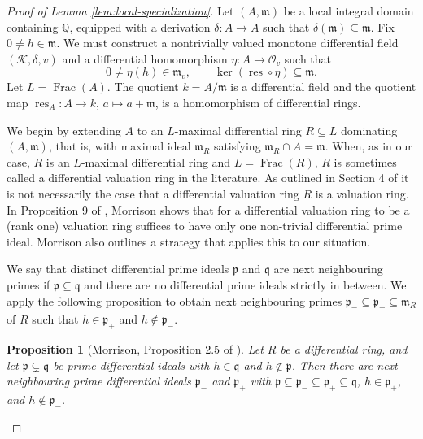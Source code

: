 \documentclass[12pt]{amsart}
\newtheorem{proposition}[theorem]{Proposition}
\theoremstyle{definition}
\numberwithin{subcase}{cases}
\theoremstyle{remark}
\DeclareMathOperator{\res}{res}
\DeclareMathOperator{\Frac}{Frac}
\begin{document}
\begin{proof}[Proof of Lemma \ref{lem:local-specialization}]
Let $(A,\mathfrak m)$ be a local integral domain containing $\mathbb{Q}$,
equipped with a derivation $\delta:A\to A$ such that
$\delta(\mathfrak m)\subseteq\mathfrak m$. Fix $0\ne h\in\mathfrak m$. We must construct a nontrivially valued monotone
differential field $(\mathcal K,\delta,v)$ and a differential
homomorphism $\eta:A\to\mathcal O_v$ such that
\begin{equation}
 0\ne\eta(h)\in\mathfrak m_v,\qquad
 \ker(\res\circ\eta)\subseteq\mathfrak m.
\end{equation}
Let $L=\Frac(A)$. The quotient $k=A/\mathfrak m$ is a
differential field and the quotient map
$\res_A:A\to k$, $a\mapsto a+\mathfrak m$, is a homomorphism of differential rings.

We begin by extending $A$ to an $L$-maximal differential ring  $R \subseteq L$ dominating $(A,\mathfrak{m})$, that is, with maximal ideal $\mathfrak{m}_R$ satisfying $\mathfrak{m}_R \cap A = \mathfrak{m}$.  When, as in our case, $R$ is an $L$-maximal differential ring and $L = \Frac(R)$, $R$ is sometimes called a differential valuation ring in the literature. As outlined in Section 4 of \cite{Morrison78} it is not necessarily the case that a differential valuation ring $R$ is a valuation ring. In Proposition 9 of \cite{Morrison78}, Morrison shows that for a differential valuation ring to be a (rank one) valuation ring suffices to have only one non-trivial differential prime ideal. Morrison \cite{Morrison79} also outlines a strategy that applies this to our situation.

We say that distinct differential prime ideals $\mathfrak{p}$ and $\mathfrak{q}$ are next neighbouring primes if $\mathfrak{p} \subseteq \mathfrak{q}$ and there are no differential prime ideals strictly in between. We apply the following proposition to obtain next neighbouring primes $\mathfrak{p}_- \subseteq \mathfrak{p}_+ \subseteq \mathfrak{m}_R$ of $R$ such that $h \in \mathfrak{p}_+$ and $h \notin \mathfrak{p}_-$.

\begin{proposition}[Morrison, Proposition 2.5 of \cite{Morrison79}]
    Let $R$ be a differential ring, and let $\mathfrak{p} \subsetneq \mathfrak{q}$ be prime differential ideals with $h \in \mathfrak{q}$ and $h \notin \mathfrak{p}$. Then there are next neighbouring prime differential ideals $\mathfrak{p}_-$ and $\mathfrak{p}_+$  with $\mathfrak{p} \subseteq \mathfrak{p}_- \subseteq \mathfrak{p}_+ \subseteq \mathfrak{q}$, $h \in \mathfrak{p}_+$, and $h \notin \mathfrak{p}_-$.
\end{proposition}


\end{proof}
\end{document}
